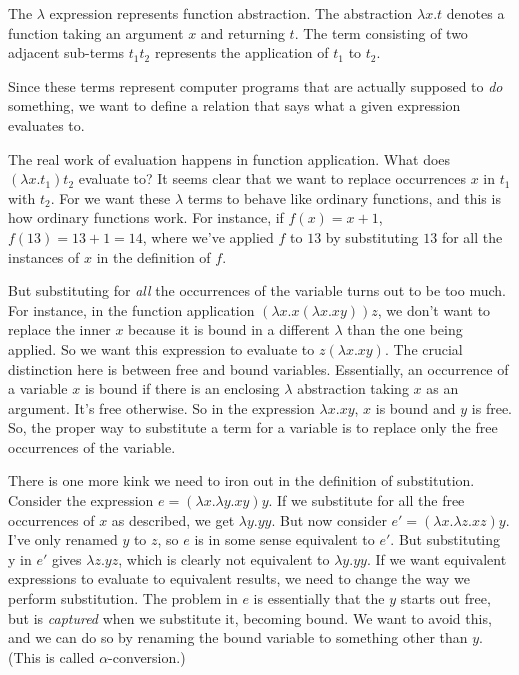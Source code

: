 \documentclass[pageno]{jpaper}
\begin{document}
{\begin{lstlisting}
\end{lstlisting}

The $\lambda$ expression represents function abstraction. The abstraction $\lambda x.t$ denotes
a function taking an argument $x$ and returning $t$. The term consisting of two adjacent sub-terms $t_1 t_2$ represents the application of $t_1$ to $t_2$.

Since these terms represent computer programs that are actually supposed to \textit{do} something, we want to
define a relation that says what a given expression evaluates to.

The real work of evaluation happens in function application. What does $(\lambda x.t_1)t_2$ evaluate to?
It seems clear that we want to replace occurrences $x$ in $t_1$ with $t_2$.
For we want these $\lambda$ terms to behave like ordinary functions, and this is how ordinary functions work.
For instance, if $f(x) = x + 1$, $f(13) = 13 + 1 = 14$, where we've applied $f$ to $13$ by substituting
$13$ for all the instances of $x$ in the definition of $f$.

But substituting for \textit{all} the occurrences of the variable turns out to be too much.
For instance, in the function application $(\lambda x. x (\lambda x. x y)) z$, we don't want to replace the inner
$x$ because it is bound in a different $\lambda$ than the one being applied.
So we want this expression to evaluate to $z (\lambda x. x y)$. The crucial distinction here is between
free and bound variables. Essentially, an occurrence of a variable $x$ is bound if there is an enclosing $\lambda$ abstraction taking $x$ as an argument.  It's free otherwise. So in the expression $\lambda x. x y$,
$x$ is bound and $y$ is free.  So, the proper way to substitute a term for a variable is to replace only
the free occurrences of the variable. 

There is one more kink we need to iron out in the definition of substitution. Consider the expression
$e = (\lambda x. \lambda y. x y) y$. If we substitute for all the free occurrences of $x$ as described, we get
$\lambda y.y y$. But now consider $e' = (\lambda x. \lambda z. x z) y$. I've only renamed $y$ to $z$, so
$e$ is in some sense equivalent to $e'$. But substituting y in $e'$ gives $\lambda z.y z$, which is clearly not equivalent to $\lambda y. y y$. If we want equivalent expressions to evaluate to equivalent results, we need to
change the way we perform substitution. The problem in $e$ is essentially that the $y$ starts out free, but is
\textit{captured} when we substitute it, becoming bound.  We want to avoid this, and we can do so by
renaming the bound variable to something other than $y$. (This is called $\alpha$-conversion.)

}
\end{document}
